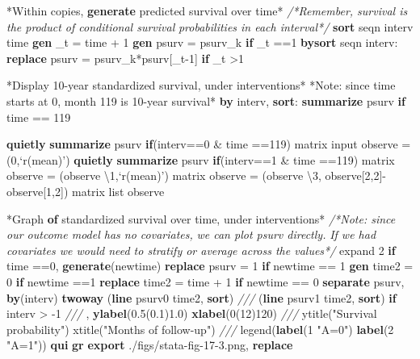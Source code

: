 \documentclass[
  10pt,
]{book}
\newenvironment{Shaded}{\begin{snugshade}}{\end{snugshade}}
\newcommand{\BaseNTok}[1]{\textcolor[rgb]{0.00,0.00,0.81}{#1}}
\newcommand{\CommentTok}[1]{\textcolor[rgb]{0.56,0.35,0.01}{\textit{#1}}}
\newcommand{\FunctionTok}[1]{\textcolor[rgb]{0.00,0.00,0.00}{#1}}
\newcommand{\KeywordTok}[1]{\textcolor[rgb]{0.13,0.29,0.53}{\textbf{#1}}}
\newcommand{\NormalTok}[1]{#1}
\newcommand{\OtherTok}[1]{\textcolor[rgb]{0.56,0.35,0.01}{#1}}
\newcommand{\StringTok}[1]{\textcolor[rgb]{0.31,0.60,0.02}{#1}}
\begin{document}
\begin{Shaded}
\begin{Highlighting}[]
\NormalTok{*Within copies, }\KeywordTok{generate}\NormalTok{ predicted survival }\BaseNTok{over}\NormalTok{ time*}
\CommentTok{/*Remember, survival is the product of conditional survival}
\CommentTok{probabilities in each interval*/}
\KeywordTok{sort}\NormalTok{ seqn interv time}
\KeywordTok{gen}\NormalTok{ _t = time + 1}
\KeywordTok{gen}\NormalTok{ psurv = psurv_k }\KeywordTok{if}\NormalTok{ _t ==1 		}
\KeywordTok{bysort}\NormalTok{ seqn interv: }\KeywordTok{replace}\NormalTok{ psurv = psurv_k*psurv[_t-1] }\KeywordTok{if}\NormalTok{ _t >1 }

\NormalTok{*Display 10-}\FunctionTok{year}\NormalTok{ standardized survival, under interventions*}
\NormalTok{*Note: since time starts }\FunctionTok{at}\NormalTok{ 0, }\FunctionTok{month}\NormalTok{ 119 is 10-}\FunctionTok{year}\NormalTok{ survival*}
\KeywordTok{by}\NormalTok{ interv, }\KeywordTok{sort}\NormalTok{: }\KeywordTok{summarize}\NormalTok{ psurv }\KeywordTok{if}\NormalTok{ time == 119}

\KeywordTok{quietly} \KeywordTok{summarize}\NormalTok{ psurv }\KeywordTok{if}\NormalTok{(interv==0 & time ==119)}
\FunctionTok{matrix}\NormalTok{ input observe = (0,}\OtherTok{`r(mean)'}\NormalTok{)}
\KeywordTok{quietly} \KeywordTok{summarize}\NormalTok{ psurv }\KeywordTok{if}\NormalTok{(interv==1 & time ==119)}
\FunctionTok{matrix}\NormalTok{ observe = (observe \textbackslash{}1,}\OtherTok{`r(mean)'}\NormalTok{)}
\FunctionTok{matrix}\NormalTok{ observe = (observe \textbackslash{}3, observe[2,2]-observe[1,2]) }
\FunctionTok{matrix} \OtherTok{list}\NormalTok{ observe}

\NormalTok{*Graph }\KeywordTok{of}\NormalTok{ standardized survival }\BaseNTok{over}\NormalTok{ time, under interventions*}
\CommentTok{/*Note: since our outcome model has no covariates, }
\CommentTok{we can plot psurv directly. }
\CommentTok{If we had covariates we would need to stratify or average across the values*/}
\NormalTok{expand 2 }\KeywordTok{if}\NormalTok{ time ==0, }\KeywordTok{generate}\NormalTok{(newtime)}
\KeywordTok{replace}\NormalTok{ psurv  = 1 }\KeywordTok{if}\NormalTok{ newtime == 1}
\KeywordTok{gen}\NormalTok{ time2 = 0 }\KeywordTok{if}\NormalTok{ newtime ==1}
\KeywordTok{replace}\NormalTok{ time2 = time + 1 }\KeywordTok{if}\NormalTok{ newtime == 0}
\KeywordTok{separate}\NormalTok{ psurv, }\KeywordTok{by}\NormalTok{(interv) }
\KeywordTok{twoway}\NormalTok{ (}\KeywordTok{line}\NormalTok{ psurv0 time2, }\KeywordTok{sort}\NormalTok{) }\CommentTok{///}
\NormalTok{  (}\KeywordTok{line}\NormalTok{ psurv1 time2, }\KeywordTok{sort}\NormalTok{) }\KeywordTok{if}\NormalTok{ interv > -1 }\CommentTok{///}
\NormalTok{  , }\KeywordTok{ylabel}\NormalTok{(0.5(0.1)1.0) }\KeywordTok{xlabel}\NormalTok{(0(12)120) }\CommentTok{///}
  \BaseNTok{ytitle}\NormalTok{(}\StringTok{"Survival probability"}\NormalTok{) }\BaseNTok{xtitle}\NormalTok{(}\StringTok{"Months of follow-up"}\NormalTok{) }\CommentTok{///}
  \BaseNTok{legend}\NormalTok{(}\KeywordTok{label}\NormalTok{(1 }\StringTok{"A=0"}\NormalTok{) }\KeywordTok{label}\NormalTok{(2 }\StringTok{"A=1"}\NormalTok{))}
\KeywordTok{qui} \KeywordTok{gr} \KeywordTok{export}\NormalTok{ ./figs/stata-fig-17-3.png, }\KeywordTok{replace}


\end{Highlighting}
\end{Shaded}
\end{document}
